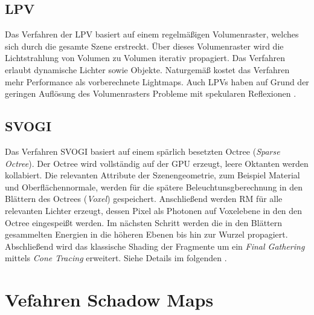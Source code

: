 \subsection{\ac{LPV}}

Das Verfahren der \ac{LPV} basiert auf einem regelmäßigen Volumenraster, welches sich durch die gesamte Szene erstreckt. Über dieses Volumenraster wird die Lichtstrahlung von Volumen zu Volumen iterativ propagiert. Das Verfahren erlaubt dynamische Lichter sowie Objekte. Naturgemäß kostet das Verfahren mehr Performance als vorberechnete Lightmaps. Auch LPVs haben auf Grund der geringen Auflösung des Volumenrasters Probleme mit spekularen Reflexionen \cite{kaplanyan2009light}.


\subsection{\acf{SVOGI}}

Das Verfahren \ac{SVOGI} basiert auf einem spärlich besetzten Octree (\textit{Sparse Octree}). Der Octree wird vollständig auf der GPU erzeugt, leere Oktanten werden kollabiert.  Die relevanten Attribute der Szenengeometrie, zum Beispiel Material und Oberflächennormale, werden für die spätere Beleuchtunsgberechnung in den Blättern des Octrees (\textit{Voxel}) gespeichert. Anschließend werden \ac{RM} für alle relevanten Lichter erzeugt, dessen Pixel als Photonen auf Voxelebene in den den Octree eingespeißt werden. Im nächsten Schritt werden die in den Blättern gesammelten Energien in die höheren Ebenen bis hin zur Wurzel propagiert. Abschließend wird das klassische Shading der Fragmente um ein \textit{Final Gathering} mittels \textit{Cone Tracing} erweitert. Siehe Details im folgenden .


\section{Vefahren Schadow Maps}
\blindtext